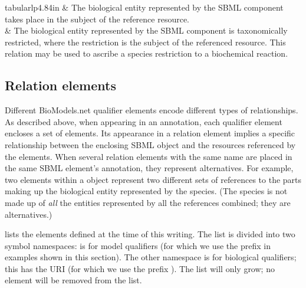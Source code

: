 \begin{table}[b]
\begin{edtable}{tabular}{lp{4.84in}}
    & The biological entity represented by
    the SBML component takes place in the subject of the reference
    resource.
    \\[6pt]
    & The biological entity represented by the SBML component is
    taxonomically restricted, where the restriction is the subject of the
    referenced resource. This relation may be used to ascribe a species
    restriction to a biochemical reaction.
    \\[3pt]
    \bottomrule
  \end{edtable}
  \label{tab:miriam-qualifiers}
\end{table}


\subsection{Relation elements}
\label{sec:qualified-dc-annotation}

Different BioModels.net qualifier elements encode different types
of relationships.  As described above, when appearing in an
annotation, each qualifier element encloses a set of
 elements.  Its appearance in a relation element
implies a specific relationship between the enclosing SBML object
and the resources referenced by the  elements.
When several relation elements with the same name are placed in
the same SBML element's annotation, they represent alternatives.
For example, two  elements within a \Species
object represent two different sets of references to the parts
making up the biological entity represented by the species.  (The
species is not made up of \emph{all} the entities represented by
all the references combined; they are alternatives.)

 lists the elements defined at
the time of this writing.  The list is divided into two symbol
namespaces:  is for model qualifiers
(for which we use the
prefix  in examples shown in this section).  The
other namespace is for biological qualifiers; this has the URI
 (for which we use
the prefix ).  The list will only grow; \ie no
element will be removed from the list.

\clearpage

